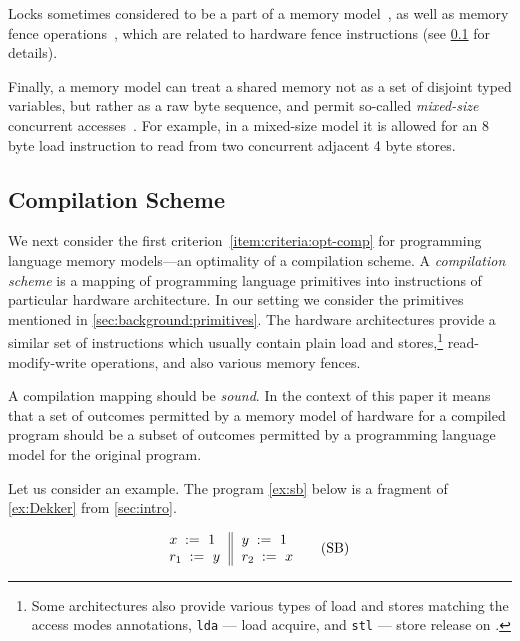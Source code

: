 Locks sometimes considered to be a part 
of a memory model~\cite{Manson-al:POPL05}, 
as well as memory fence operations~\cite{Batty-al:POPL11},
which are related to hardware fence instructions
(see \cref{sec:background:compile} for details). 

Finally, a memory model can treat a shared memory 
not as a set of disjoint typed variables, but rather as 
a raw byte sequence, and permit so-called \emph{mixed-size} 
concurrent accesses~\cite{Flur-al:POPL17}.
For example, in a mixed-size model it is 
allowed for an 8 byte load instruction 
to read from two concurrent adjacent 4 byte stores. 

\subsection{Compilation Scheme}
\label{sec:background:compile}

We next consider the first criterion~\ref{item:criteria:opt-comp}
for programming language memory models---an optimality of a compilation scheme. 
A \emph{compilation scheme} is a mapping of 
programming language primitives into 
instructions of particular hardware architecture. 
In our setting we consider the primitives 
mentioned in \cref{sec:background:primitives}.
The hardware architectures provide a similar set 
of instructions which usually contain 
plain load and stores,\footnote{Some architectures 
also provide various types of load and stores
matching the access modes annotations, 
\eg \texttt{lda} --- load acquire, 
and \texttt{stl} --- store release on .} 
read-modify-write operations, 
and also various memory fences. 

A compilation mapping should be \emph{sound}.
In the context of this paper it means that 
a set of outcomes permitted by a 
memory model of hardware for a compiled program 
should be a subset of outcomes permitted by a 
programming language model for the original program. 

Let us consider an example. 
The program \ref{ex:sb} below is a 
fragment of \ref{ex:Dekker} from \cref{sec:intro}.

\begin{equation*}
\inarrII{
   \writeInst{}{x}{1}   \\
   \readInst{}{r_1}{y}  \\
}{
  \writeInst{}{y}{1}   \\
  \readInst{}{r_2}{x}  \\
}
\tag{SB}\label{ex:sb}
\end{equation*}

